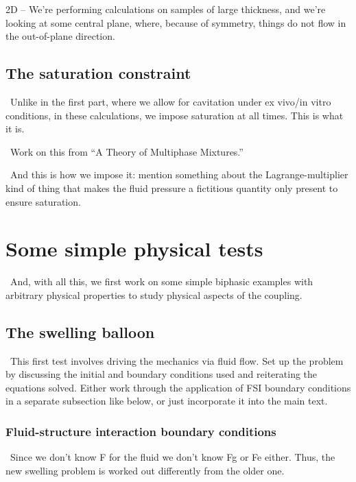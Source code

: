 2D -- We're performing calculations on samples of large
thickness, and we're looking at some central plane, where, because of
symmetry, things do not flow in the out-of-plane direction.

\subsection{The saturation constraint}
\label{eu-saturationconstraint}

\textbullet\ Unlike in the first part, where we allow for cavitation
under ex vivo/in vitro conditions, in these calculations, we impose
saturation at all times. This is what it is.

\textbullet\ Work on this from ``A Theory of Multiphase Mixtures.''

\textbullet\ And this is how we impose it: mention something about the
Lagrange-multiplier kind of thing that makes the fluid pressure a
fictitious quantity only present to ensure saturation.

\section{Some simple physical tests}
\label{simple-physics}

\textbullet\ And, with all this, we first work on some simple biphasic
examples with arbitrary physical properties to study physical aspects
of the coupling.

\subsection{The swelling balloon}
\label{balloon}

\textbullet\ This first test involves driving the mechanics via fluid
flow. Set up the problem by discussing the initial and boundary
conditions used and reiterating the equations solved. Either work
through the application of FSI boundary conditions in a separate
subsection like below, or just incorporate it into the main text.

\subsubsection{Fluid-structure interaction boundary conditions}
\label{eu-fluid-structure-interaction}

\textbullet\ Since we don't know F for the fluid we don't know Fg or
Fe either. Thus, the new swelling problem is worked out differently
from the older one.

